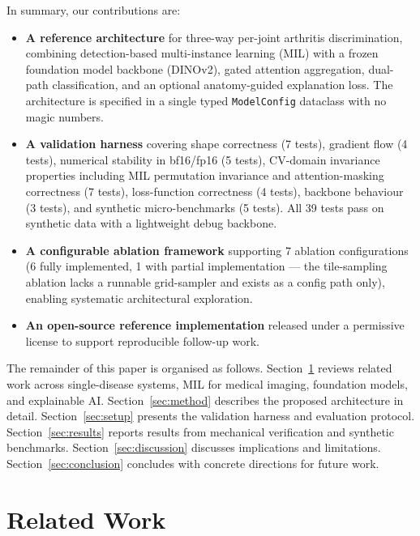 \documentclass{article}
\begin{document}
In summary, our contributions are:
\begin{itemize}
  \item \textbf{A reference architecture} for three-way per-joint arthritis discrimination, combining detection-based multi-instance learning (MIL) with a frozen foundation model backbone (DINOv2), gated attention aggregation, dual-path classification, and an optional anatomy-guided explanation loss. The architecture is specified in a single typed \texttt{ModelConfig} dataclass with no magic numbers.
  \item \textbf{A validation harness} covering shape correctness (7 tests), gradient flow (4 tests), numerical stability in bf16/fp16 (5 tests), CV-domain invariance properties including MIL permutation invariance and attention-masking correctness (7 tests), loss-function correctness (4 tests), backbone behaviour (3 tests), and synthetic micro-benchmarks (5 tests). All 39 tests pass on synthetic data with a lightweight debug backbone.
  \item \textbf{A configurable ablation framework} supporting 7 ablation configurations (6 fully implemented, 1 with partial implementation --- the tile-sampling ablation lacks a runnable grid-sampler and exists as a config path only), enabling systematic architectural exploration.
  \item \textbf{An open-source reference implementation} released under a permissive license to support reproducible follow-up work.
\end{itemize}

The remainder of this paper is organised as follows. Section~\ref{sec:related} reviews related work across single-disease systems, MIL for medical imaging, foundation models, and explainable AI. Section~\ref{sec:method} describes the proposed architecture in detail. Section~\ref{sec:setup} presents the validation harness and evaluation protocol. Section~\ref{sec:results} reports results from mechanical verification and synthetic benchmarks. Section~\ref{sec:discussion} discusses implications and limitations. Section~\ref{sec:conclusion} concludes with concrete directions for future work.

\section{Related Work}
\label{sec:related}
\end{document}
